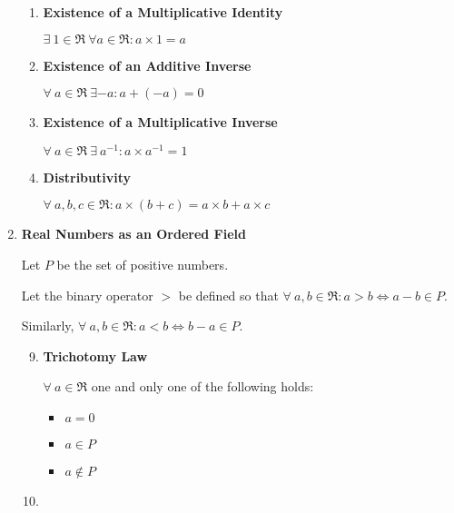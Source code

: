 \documentclass{article}
\begin{document}
\begin{enumerate}
\begin{enumerate}
\item \textbf{Existence of a Multiplicative Identity}

$\exists \ 1\in\Re\ \forall a \in \Re: a\times 1=a$

\item \textbf{Existence of an Additive Inverse}

$\forall \ a\in\Re\ \exists -a: a+(-a)=0$

\item \textbf{Existence of a Multiplicative Inverse}

$\forall \ a\in\Re\ \exists\ a^{-1}: a\times a^{-1}=1$

\item \textbf{Distributivity}

$\forall \ a,b,c \in \Re: a\times(b+c)=a\times b+a\times c$
\end{enumerate}
\item \textbf{Real Numbers as an Ordered Field}
\label{sec-1-1-1-2}

Let $P$ be the set of positive numbers.

Let the binary operator $>$ be defined so that $\forall \ a,b \in \Re: a > b \iff a-b\in P$.

Similarly,  $\forall \ a,b \in \Re: a < b \iff b-a\in P$.

\begin{enumerate}
\setcounter{enumi}{8}
\item \textbf{Trichotomy Law}

$\forall \ a \in \Re$ one and only one of the following holds:

\begin{itemize}
\item $a=0$

\item $a \in P$

\item $a \not\in P$
\end{itemize}

\item 
\end{enumerate}
\end{enumerate}
\end{document}

